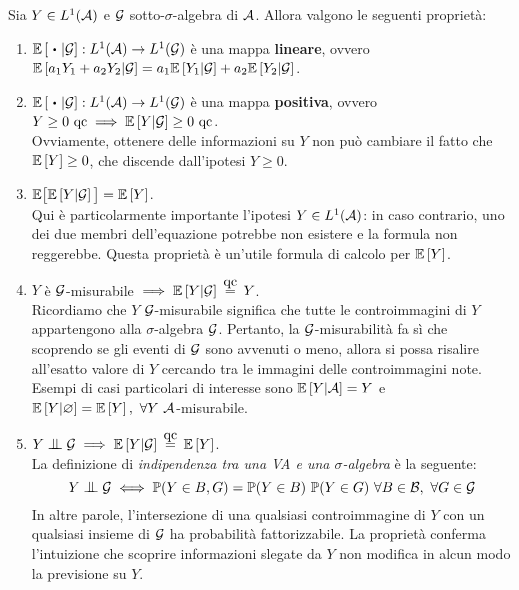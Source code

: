 \begin{teo}\label{13-reasons-why}  %
	
  Sia $Y \in L^1(\mathcal A)$ e $\mathcal G$ sotto-$\sigma$-algebra di $\mathcal A$. Allora valgono le seguenti proprietà:
  \begin{enumerate}
    \item $\Ex{\ \bigcdot \ | \Gc}: L^1(\Ac) \to L^1(\Gc)$ è una mappa \textbf{lineare},
    ovvero $\mathbb E \left[ a_1 Y_1 + a_2 Y_2 | \mathcal G \right] = a_1 \mathbb E \left[ Y_1 | \mathcal G \right] + a_2 \mathbb E \left[ Y_2 | \mathcal G \right]$.
    \item $\Ex{\ \bigcdot \ | \Gc}: L^1(\Ac) \to L^1(\Gc)$ è una mappa \textbf{positiva},
    ovvero $Y \geq 0 \text{ qc} \implies \mathbb E \left[ Y|\mathcal G \right] \geq 0 \text{ qc}$. \\
    Ovviamente, ottenere delle informazioni su $Y$ non può cambiare il fatto che $\mathbb E \left[ Y \right] \geq 0$, che discende dall'ipotesi $Y \geq 0$.
    \item $\mathbb E \big[ \mathbb E \left[ Y|\mathcal G \right] \big] = \mathbb E \left[ Y \right]$. \\
    Qui è particolarmente importante l'ipotesi $Y \in L^1(\mathcal A)$: in caso contrario, uno dei due membri dell'equazione potrebbe non esistere e la formula non reggerebbe. Questa proprietà è un'utile formula di calcolo per $\mathbb E \left[ Y \right]$.
    \item $Y$ è $\mathcal G$-misurabile $\implies \Ex{Y|\Gc} \aceq Y$. \\
    Ricordiamo che $Y$ $\mathcal G$-misurabile significa che tutte le controimmagini di $Y$ appartengono alla $\sigma$-algebra $\mathcal G$. Pertanto, la $\mathcal G$-misurabilità fa sì che scoprendo se gli eventi di $\mathcal G$ sono avvenuti o meno, allora si possa risalire all'esatto valore di $Y$ cercando tra le immagini delle controimmagini note. Esempi di casi particolari di interesse sono  $ \mathbb E \left[ Y | \mathcal A \right] = Y$ e $\Ex{Y | \varnothing} = \Ex Y, \ \forall Y \ \Ac$-misurabile.
    \item $Y \indep \Gc \implies \Ex{Y|\Gc} \aceq \Ex Y$. \\
    La definizione di \emph{indipendenza tra una VA e una $\sigma$-algebra} è la seguente:
    $$ Y \indep \Gc \iff \PP(Y \in B, G) = \PP(Y \in B) \ \PP(Y \in G) \ \forall B \in \Bc, \ \forall G \in \Gc$$
    In altre parole, l'intersezione di una qualsiasi controimmagine di $Y$ con un qualsiasi insieme di $\mathcal G$ ha probabilità fattorizzabile. La proprietà conferma l'intuizione che scoprire informazioni slegate da $Y$ non modifica in alcun modo la previsione su $Y$.

\end{enumerate}
\end{teo}
